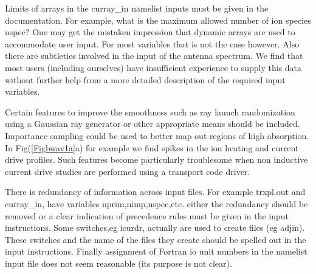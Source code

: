  Limits of arrays in the curray\_in namelist inputs must be given
in the documentation. For example, what is the maximum allowed number
of ion species nspec? One may get the mistaken impression that dynamic
arrays are used to accommodate user input. For most variables that is
not the case however. Also there are subtleties involved in the input of the
antenna spectrum. We find that most users (including ourselves) have insufficient
experience to supply this data without further help from  a more
detailed description of the required input variables.

 Certain
features to improve the smoothness such as ray launch randomization using a  Gaussian 
ray generator or other appropriate means should be
included. Importance sampling could be used to better map out regions
of high absorption. In Fig(\ref{Figbwav1a}a) for example we find
spikes in the ion heating and current drive profiles. Such features
become particularly troublesome when non inductive current drive
studies are performed using a transport code driver.
  
There is redundancy of information across input files. For example  
trxpl.out and curray\_in, have variables nprim,nimp,nspec,etc. either
the redundancy should be removed or a clear indication of precedence
rules must be given in the input instructions.
Some switches,eg icurdr, actually are used to create files
 (eg adjin). These switches and the name of the files  they create
 should be spelled out in the input instructions.
Finally assignment of Fortran io  unit numbers in the namelist input
  file does not seem reasonable (its purpose is not clear).



